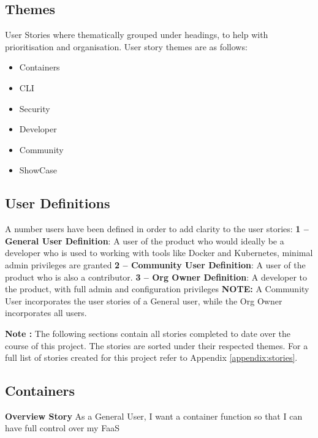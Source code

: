 \clearpage
\subsection{Themes}
User Stories where thematically grouped under headings, to help with prioritisation and organisation. User story themes are as follows:
\begin{itemize}
    \item Containers
    \item CLI
    \item Security
    \item Developer
    \item Community
    \item ShowCase
\end{itemize}

\subsection{User Definitions}
A number users have been defined in order to add clarity to the user stories:
\newline
\textbf{1 -- General User Definition}: A user of the product who would ideally be a developer who is used to working with tools like \gls{Docker} and \gls{Kubernetes}, minimal admin privileges are granted
\newline
\textbf{2 -- Community User Definition}: A user of the product who is also a contributor.
\newline
\textbf{3 -- Org Owner Definition}: A developer to the product, with full admin and configuration privileges
\newline \textbf{NOTE:} A Community User incorporates the user stories of a General user, while the Org Owner incorporates all users.


\clearpage

\textbf{Note : }The following sections contain all stories completed to date over the course of this project. The stories are sorted under their respected themes. For a full list of stories created for this project refer to Appendix \ref{appendix:stories}.

\subsection{Containers}
\textbf{Overview Story}
\newline As a General User, I want a container function so that I can have full control over my FaaS

